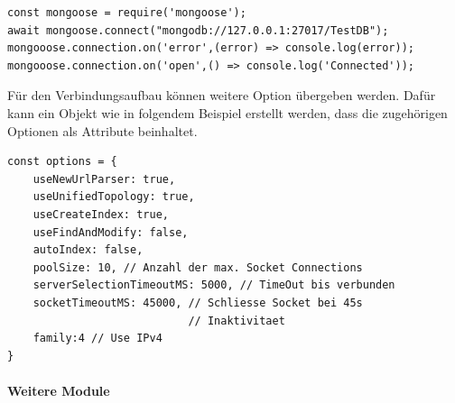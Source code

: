 \begin{lstlisting}[caption=Mongoose: Verbindung zur Datenbank aufbauen,
label=lst:MongooseConnect]
const mongoose = require('mongoose');
await mongoose.connect("mongodb://127.0.0.1:27017/TestDB");
mongooose.connection.on('error',(error) => console.log(error));
mongooose.connection.on('open',() => console.log('Connected'));
\end{lstlisting}


Für den Verbindungsaufbau können weitere Option übergeben werden. Dafür kann ein Objekt wie in folgendem Beispiel erstellt werden, dass die zugehörigen Optionen als Attribute beinhaltet. 
\newline

\begin{lstlisting}[caption=Mongoose Verbindungsoptionen -nodejs 3.3- ,label=lst:MongooseConnect]
const options = {
	useNewUrlParser: true,
	useUnifiedTopology: true,
	useCreateIndex: true,
	useFindAndModify: false,
	autoIndex: false,
	poolSize: 10, // Anzahl der max. Socket Connections
	serverSelectionTimeoutMS: 5000, // TimeOut bis verbunden
	socketTimeoutMS: 45000, // Schliesse Socket bei 45s                 
	                        // Inaktivitaet
	family:4 // Use IPv4
}
\end{lstlisting}


\paragraph{Weitere Module}

